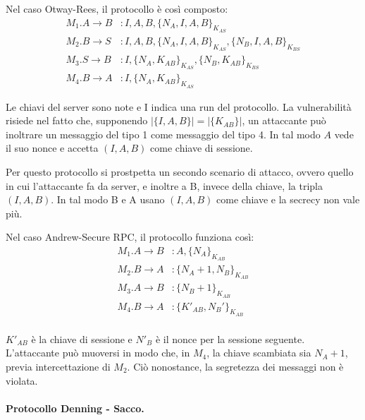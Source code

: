 \documentclass[a4paper, 11pt, twoside]{article}
\begin{document}
	Nel caso Otway-Rees, il protocollo è così composto: \begin{align*}
		M_1. A \to B&: I,A,B, \lbrace N_A, I, A, B\rbrace_{K_{AS}} \\
		M_2. B \to S&: I,A,B, \lbrace N_A, I, A, B\rbrace_{K_{AS}}, \lbrace N_B, I, A, B\rbrace_{K_{BS}} \\
		M_3. S \to B&: I, \lbrace N_A, K_{AB}\rbrace_{K_{AS}}, \lbrace N_B, K_{AB}\rbrace_{K_{BS}}\\
		M_4. B \to A&: I, \lbrace N_A, K_{AB}\rbrace_{K_{AS}}
	\end{align*}

	Le chiavi del server sono note e I indica una run del protocollo.
	La vulnerabilità risiede nel fatto che, supponendo $\vert \lbrace I,A,B\rbrace\vert = \vert\lbrace K_{AB} \rbrace\vert$, un attaccante può inoltrare un messaggio del tipo 1 come messaggio del tipo 4. In tal modo $A$ vede il suo nonce e accetta $(I, A, B)$ come chiave di sessione.

	Per questo protocollo si prostpetta un secondo scenario di attacco, ovvero quello in cui l'attaccante fa da server, e inoltre a B, invece della chiave, la tripla $(I, A, B)$. In tal modo B e A usano $(I, A, B)$ come chiave e la secrecy non vale più.
	
	Nel caso Andrew-Secure RPC, il protocollo funziona così: \begin{align*}
		M_1. A \to B&: A, \lbrace N_A\rbrace_{K_{AB}}\\
		M_2. B \to A&: \lbrace N_A +1, N_B\rbrace_{K_{AB}}\\
		M_3. A \to B&: \lbrace N_B + 1\rbrace_{K_{AB}}\\
		M_4. B \to A&: \lbrace K'_{AB}, N_B'\rbrace_{K_{AB}}\\
	\end{align*}

	$K'_{AB}$ è la chiave di sessione e $N'_B$ è il nonce per la sessione seguente. L'attaccante può muoversi in modo che, in $M_4$, la chiave scambiata sia $N_A + 1$, previa intercettazione di $M_2$. Ciò nonostance, la segretezza dei messaggi non è violata.

	\paragraph{Protocollo Denning - Sacco.}

	
	
	
	
	
	
	
	
\end{document}
